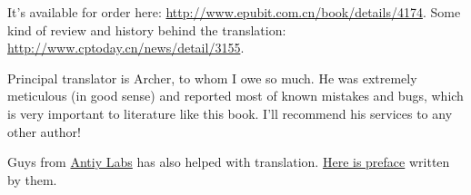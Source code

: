  It's available for order here: \url{http://www.epubit.com.cn/book/details/4174}. Some kind of review and history behind the translation: \url{http://www.cptoday.cn/news/detail/3155}.

Principal translator is Archer, to whom I owe so much. He was extremely meticulous (in good sense) and reported most of known mistakes and bugs, which is very important to literature like this book.
I'll recommend his services to any other author!

Guys from \href{http://www.antiy.net/}{Antiy Labs} has also helped with translation. \href{http://www.epubit.com.cn/book/onlinechapter/51413}{Here is preface} written by them.



